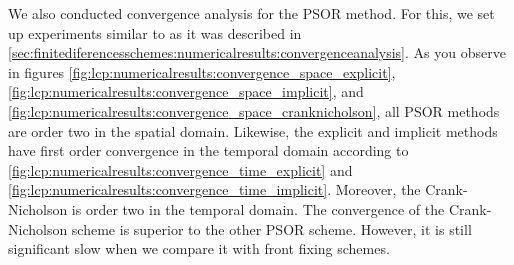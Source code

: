 We also conducted convergence analysis for the PSOR method. For this, we set up experiments similar to as it was described in \eqref{sec:finitediferencesschemes:numericalresults:convergenceanalysis}. As you observe in figures \eqref{fig:lcp:numericalresults:convergence_space_explicit}, \eqref{fig:lcp:numericalresults:convergence_space_implicit}, and \eqref{fig:lcp:numericalresults:convergence_space_cranknicholson}, all PSOR methods are order two in the spatial domain. Likewise, the explicit and implicit methods have first order convergence in the temporal domain according to \eqref{fig:lcp:numericalresults:convergence_time_explicit} and \eqref{fig:lcp:numericalresults:convergence_time_implicit}. Moreover, the Crank-Nicholson is order two in the temporal domain. The convergence of the Crank-Nicholson scheme is superior to the other PSOR scheme. However, it is still significant slow when we compare it with front fixing schemes. 
